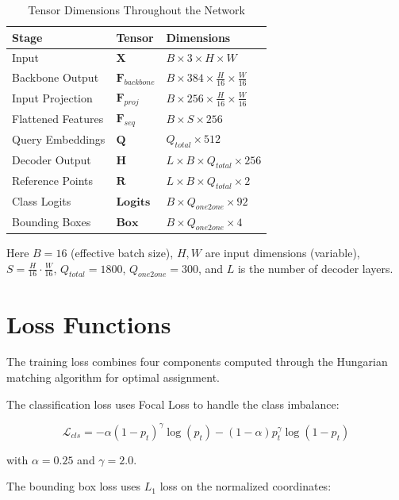 \documentclass[12pt,a4paper]{article}
\newcommand{\B}[1]{\mathbf{#1}}
\begin{document}
\begin{table}[htbp]
\centering
\caption{Tensor Dimensions Throughout the Network}
\label{tab:tensors}
\begin{tabular}{lll}
\toprule
\textbf{Stage} & \textbf{Tensor} & \textbf{Dimensions} \\
\midrule
Input & $\B{X}$ & $B \times 3 \times H \times W$ \\
Backbone Output & $\B{F}_{backbone}$ & $B \times 384 \times \frac{H}{16} \times \frac{W}{16}$ \\
Input Projection & $\B{F}_{proj}$ & $B \times 256 \times \frac{H}{16} \times \frac{W}{16}$ \\
Flattened Features & $\B{F}_{seq}$ & $B \times S \times 256$ \\
Query Embeddings & $\B{Q}$ & $Q_{total} \times 512$ \\
Decoder Output & $\B{H}$ & $L \times B \times Q_{total} \times 256$ \\
Reference Points & $\B{R}$ & $L \times B \times Q_{total} \times 2$ \\
Class Logits & $\B{Logits}$ & $B \times Q_{one2one} \times 92$ \\
Bounding Boxes & $\B{Box}$ & $B \times Q_{one2one} \times 4$ \\
\bottomrule
\end{tabular}
\end{table}

Here $B=16$ (effective batch size), $H, W$ are input dimensions (variable), $S = \frac{H}{16} \cdot \frac{W}{16}$, $Q_{total} = 1800$, $Q_{one2one} = 300$, and $L$ is the number of decoder layers.

\section{Loss Functions}

The training loss combines four components computed through the Hungarian matching algorithm for optimal assignment.

The classification loss uses Focal Loss to handle the class imbalance:

\begin{equation}
\mathcal{L}_{cls} = -\alpha (1-p_t)^\gamma \log(p_t) - (1-\alpha) p_t^\gamma \log(1-p_t)
\end{equation}

with $\alpha = 0.25$ and $\gamma = 2.0$.

The bounding box loss uses $L_1$ loss on the normalized coordinates:
\end{document}
